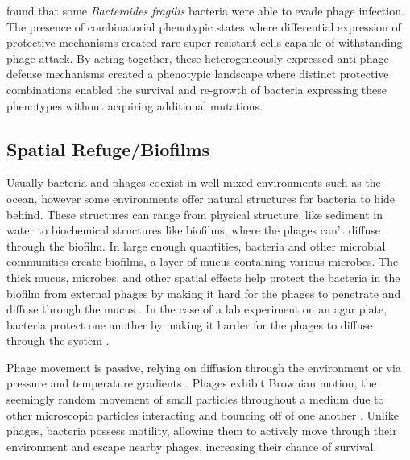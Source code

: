 \citet{guptaCombinatorialPhenotypicLandscape2025} found that some \textit{Bacteroides fragilis} bacteria were able to evade phage infection.  
The presence of combinatorial phenotypic states where differential expression of protective mechanisms created rare super-resistant cells capable of withstanding phage attack.
By acting together, these heterogeneously expressed anti-phage defense mechanisms created a phenotypic landscape where distinct protective combinations enabled the survival and re-growth of bacteria expressing these phenotypes without acquiring additional mutations. 

\subsection{Spatial Refuge/Biofilms} 
Usually bacteria and phages coexist in well mixed environments such as the ocean, however some environments offer natural structures for bacteria to hide behind. 
These structures can range from physical structure, like sediment in water to biochemical structures like biofilms, where the phages can't diffuse through the biofilm. 
In large enough quantities, bacteria and other microbial communities create biofilms, a layer of mucus containing various microbes. 
The thick mucus, microbes, and other spatial effects help protect the bacteria in the biofilm from external phages by making it hard for the phages to penetrate and diffuse through the mucus \cite{abedonPhageDelayEnhancing2017}. 
In the case of a lab experiment on an agar plate, bacteria protect one another by making it harder for the phages to diffuse through the system \cite{eriksenGrowingMicrocolonyCan2018}. 

Phage movement is passive, relying on diffusion through the environment or via pressure and temperature gradients \cite{lohrmannInfluenceBacterialSwimming2024}. 
Phages exhibit Brownian motion, the seemingly random movement of small particles throughout a medium due to other microscopic particles interacting and bouncing off of one another \cite{moineauBacteriophage2013}. 
Unlike phages, bacteria possess motility, allowing them to actively move through their environment and escape nearby phages, increasing their chance of survival. 



